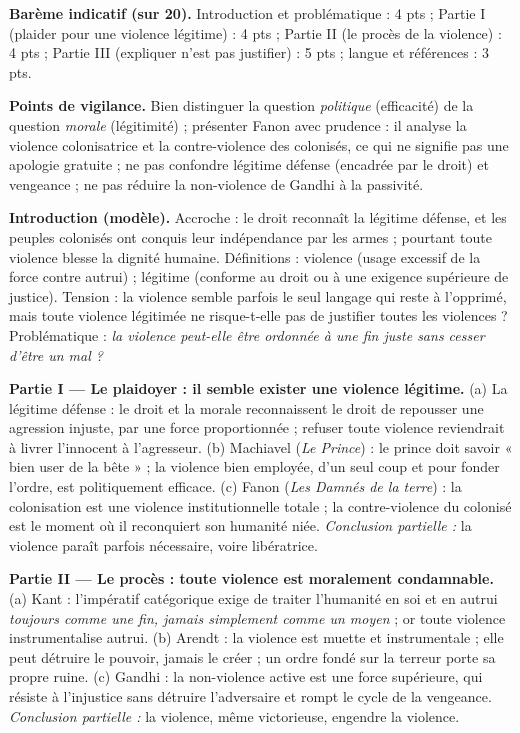 \documentclass[11pt]{article}
\begin{document}
\begin{corrige}

\textbf{Barème indicatif (sur 20).} Introduction et problématique : 4 pts ; Partie I (plaider pour une violence légitime) : 4 pts ; Partie II (le procès de la violence) : 4 pts ; Partie III (expliquer n'est pas justifier) : 5 pts ; langue et références : 3 pts.

\textbf{Points de vigilance.} Bien distinguer la question \emph{politique} (efficacité) de la question \emph{morale} (légitimité) ; présenter Fanon avec prudence : il analyse la violence colonisatrice et la contre-violence des colonisés, ce qui ne signifie pas une apologie gratuite ; ne pas confondre légitime défense (encadrée par le droit) et vengeance ; ne pas réduire la non-violence de Gandhi à la passivité.

\textbf{Introduction (modèle).} Accroche : le droit reconnaît la légitime défense, et les peuples colonisés ont conquis leur indépendance par les armes ; pourtant toute violence blesse la dignité humaine. Définitions : violence (usage excessif de la force contre autrui) ; légitime (conforme au droit ou à une exigence supérieure de justice). Tension : la violence semble parfois le seul langage qui reste à l'opprimé, mais toute violence légitimée ne risque-t-elle pas de justifier toutes les violences ? Problématique : \emph{la violence peut-elle être ordonnée à une fin juste sans cesser d'être un mal ?}

\textbf{Partie I — Le plaidoyer : il semble exister une violence légitime.} (a) La légitime défense : le droit et la morale reconnaissent le droit de repousser une agression injuste, par une force proportionnée ; refuser toute violence reviendrait à livrer l'innocent à l'agresseur. (b) Machiavel (\emph{Le Prince}) : le prince doit savoir « bien user de la bête » ; la violence bien employée, d'un seul coup et pour fonder l'ordre, est politiquement efficace. (c) Fanon (\emph{Les Damnés de la terre}) : la colonisation est une violence institutionnelle totale ; la contre-violence du colonisé est le moment où il reconquiert son humanité niée. \emph{Conclusion partielle :} la violence paraît parfois nécessaire, voire libératrice.

\textbf{Partie II — Le procès : toute violence est moralement condamnable.} (a) Kant : l'impératif catégorique exige de traiter l'humanité en soi et en autrui \emph{toujours comme une fin, jamais simplement comme un moyen} ; or toute violence instrumentalise autrui. (b) Arendt : la violence est muette et instrumentale ; elle peut détruire le pouvoir, jamais le créer ; un ordre fondé sur la terreur porte sa propre ruine. (c) Gandhi : la non-violence active est une force supérieure, qui résiste à l'injustice sans détruire l'adversaire et rompt le cycle de la vengeance. \emph{Conclusion partielle :} la violence, même victorieuse, engendre la violence.


\end{corrige}
\end{document}
